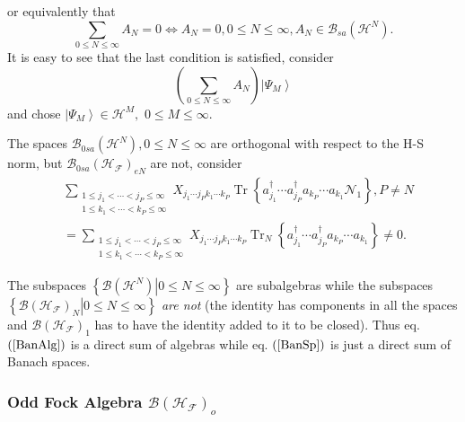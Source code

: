 \documentclass[aps,preprint]{revtex4}%
\begin{document}
or equivalently that
\begin{equation}
\sum_{0\leq N\leq\infty}A_{N}=0\Leftrightarrow A_{N}=0,0\leq N\leq\infty
,A_{N}\in\mathcal{B}_{sa}\left(  \mathcal{H}^{N}\right)  .
\end{equation}
It is easy to see that the last condition is satisfied, consider
\begin{equation}
\left(  \sum_{0\leq N\leq\infty}A_{N}\right)  \left\vert \Psi_{M}%
\right\rangle
\end{equation}
and chose $\left\vert \Psi_{M}\right\rangle \in\mathcal{H}^{M},$ $0\leq
M\leq\infty.$

The spaces $\mathcal{B}_{0sa}\left(  \mathcal{H}^{N}\right)  ,0\leq
N\leq\infty$ are orthogonal with respect to the H-S norm, but $\mathcal{B}%
_{0sa}\left(  \mathcal{H}_{\mathcal{F}}\right)  _{eN}$ are not, consider%
\begin{align}
&  \sum_{\substack{1\leq j_{1}<\cdots<j_{P}\leq\infty\\1\leq k_{1}%
<\cdots<k_{P}\leq\infty}}X_{j_{1}\cdots j_{P}k_{1}\cdots k_{P}}%
\operatorname*{Tr}\left\{  a_{j_{1}}^{\dagger}\cdots a_{j_{P}}^{\dagger
}a_{k_{P}}\cdots a_{k_{1}}\mathcal{N}_{1}\right\}  ,P\neq N\nonumber\\
&  =\sum_{\substack{1\leq j_{1}<\cdots<j_{P}\leq\infty\\1\leq k_{1}%
<\cdots<k_{P}\leq\infty}}X_{j_{1}\cdots j_{P}k_{1}\cdots k_{P}}%
\operatorname*{Tr}\nolimits_{N}\left\{  a_{j_{1}}^{\dagger}\cdots a_{j_{P}%
}^{\dagger}a_{k_{P}}\cdots a_{k_{1}}\right\}  \neq0.
\end{align}


The subspaces $\left\{  \left.  \mathcal{B}\left(  \mathcal{H}^{N}\right)
\right\vert 0\leq N\leq\infty\right\}  $ are subalgebras while the subspaces
$\left\{  \left.  \mathcal{B}\left(  \mathcal{H}_{\mathcal{F}}\right)
_{N}\right\vert 0\leq N\leq\infty\right\}  $ \emph{are not }(the identity has
components in all the spaces and $\mathcal{B}\left(  \mathcal{H}_{\mathcal{F}%
}\right)  _{1}$ has to have the identity added to it to be closed). Thus eq.
$\left(  \ref{BanAlg}\right)  $ is a direct sum of algebras while eq. $\left(
\ref{BanSp}\right)  $ is just a direct sum of Banach spaces.

\subsubsection{Odd Fock Algebra $\mathcal{B}\left(  \mathcal{H}_{\mathcal{F}%
}\right)  _{o}$}
\end{document}
